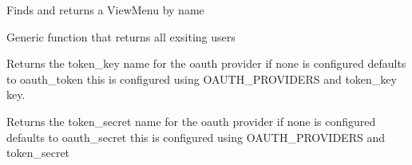 \documentclass[letterpaper,10pt,english]{sphinxmanual}
\begin{document}
\begin{fulllineitems}
\begin{fulllineitems}
\end{fulllineitems}


\begin{fulllineitems}
\label{api:flask.ext.appbuilder.security.manager.BaseSecurityManager.find_view_menu}
Finds and returns a ViewMenu by name

\end{fulllineitems}


\begin{fulllineitems}
\label{api:flask.ext.appbuilder.security.manager.BaseSecurityManager.get_all_users}
Generic function that returns all exsiting users

\end{fulllineitems}


\begin{fulllineitems}
\label{api:flask.ext.appbuilder.security.manager.BaseSecurityManager.get_oauth_token_key_name}
Returns the token\_key name for the oauth provider
if none is configured defaults to oauth\_token
this is configured using OAUTH\_PROVIDERS and token\_key key.

\end{fulllineitems}


\begin{fulllineitems}
\label{api:flask.ext.appbuilder.security.manager.BaseSecurityManager.get_oauth_token_secret_name}
Returns the token\_secret name for the oauth provider
if none is configured defaults to oauth\_secret
this is configured using OAUTH\_PROVIDERS and token\_secret

\end{fulllineitems}



\end{fulllineitems}
\end{document}
